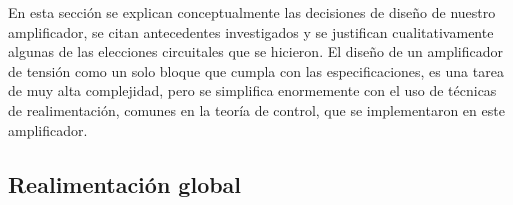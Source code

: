 En esta sección se explican conceptualmente las decisiones de diseño de nuestro amplificador, se citan antecedentes investigados y se justifican cualitativamente algunas de las elecciones circuitales que se hicieron.
El diseño de un amplificador de tensión como un solo bloque que cumpla con las especificaciones, es una tarea de muy alta complejidad, pero se simplifica enormemente con el uso de técnicas de realimentación, comunes en la teoría de control, que se implementaron en este amplificador. 



\subsection{Realimentación global}
